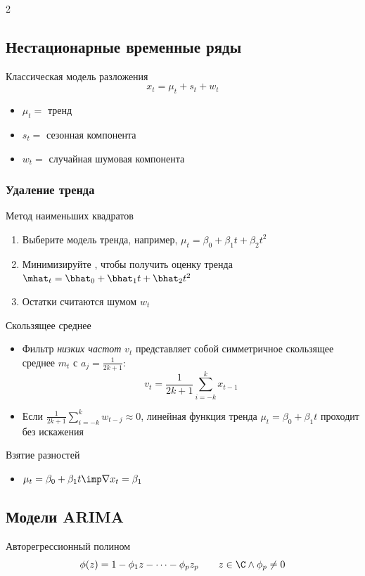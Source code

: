 \documentclass[landscape]{article}
\begin{document}
\begin{multicols*}{2}
\subsection{Нестационарные временные ряды}

Классическая модель разложения
\[x_t = \mu_t + s_t + w_t\]
\begin{itemize}
  \item $\mu_t =$ тренд
  \item $s_t =$ сезонная компонента
  \item $w_t =$ случайная шумовая компонента
\end{itemize}

\subsubsection{Удаление тренда}

Метод наименьших квадратов
\begin{enumerate}
  \item Выберите модель тренда, например,
    $\mu_t = \beta_0 + \beta_1 t + \beta_2 t^2$
  \item Минимизируйте \rss, чтобы получить оценку тренда
    $\mhat_t = \bhat_0 + \bhat_1 t + \bhat_2 t^2$
  \item Остатки считаются шумом $w_t$
\end{enumerate}

Скользящее среднее
\begin{itemize}
  \item Фильтр \emph{низких частот} $v_t$ представляет собой симметричное скользящее среднее $m_t$
    с $a_j = \frac{1}{2k+1}$:
    \[v_t = \frac{1}{2k+1} \sum_{i=-k}^k x_{t-1}\]
  \item Если $\frac{1}{2k+1} \sum_{i=-k}^k w_{t-j} \approx 0$,
    линейная функция тренда $\mu_t = \beta_0 + \beta_1t$ проходит без
    искажения
\end{itemize}

Взятие разностей
\begin{itemize}
  \item $\mu_t = \beta_0 + \beta_1t \imp \nabla x_t = \beta_1$
\end{itemize}

\subsection{Модели ARIMA}

Авторегрессионный полином
\[\phi(z) = 1 - \phi_1 z - \cdots - \phi_p z_p
\qquad z \in \C \wedge \phi_p \neq 0\]


\end{multicols*}
\end{document}
